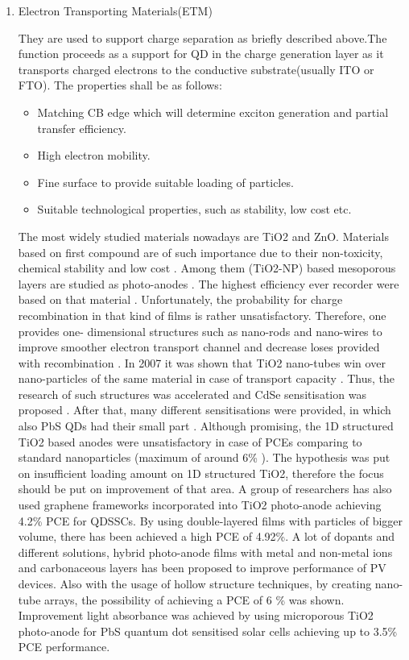 \begin{enumerate}

\item Electron Transporting Materials(ETM)

They are used to support charge separation as briefly described above.The function proceeds as a support for QD in the charge generation layer as it transports charged electrons to the conductive substrate(usually ITO or FTO). \cite{X.Gao2017} \cite{Tian2015} The properties shall be as follows:
\begin{itemize}
\item
  Matching CB edge which will determine exciton generation and
  partial transfer efficiency.
\item
  High electron mobility.
\item
  Fine surface to provide suitable loading of particles.
\item
  Suitable technological properties, such as stability, low cost etc.
\end{itemize}

The most widely studied materials nowadays are TiO2 and ZnO. Materials based on first compound are of such importance due to their non-toxicity, chemical stability and low cost \cite{I.Mora-Sero2014a} \cite{Tian2015} . Among them (TiO2-NP) based mesoporous layers are studied as photo-anodes \cite{I.Mora-Sero2014a} . The highest efficiency ever recorder were based on that material \cite{Du2016} \cite{J.Du2017} . Unfortunately, the probability for charge recombination in that kind of films is rather unsatisfactory.  Therefore, one provides one- dimensional structures such as nano-rods and nano-wires to improve smoother electron transport channel and decrease loses provided with recombination \cite{Y.Liu2014} \cite{M.A.Manthrammel2015} . In 2007 it was shown that TiO2 nano-tubes win over nano-particles of the same material in case of transport capacity \cite{Kamat2009} \cite{Tvrdy2008} .  Thus, the research of such structures was accelerated and CdSe sensitisation was proposed \cite{A.Yamada2010} . After that, many different sensitisations were provided, in which also PbS QDs had their small part \cite{C.Shi2017} . Although promising, the 1D structured TiO2 based anodes were unsatisfactory in case of PCEs comparing to standard nanoparticles (maximum of around 6\%  ). The hypothesis was put on insufficient loading amount on 1D structured TiO2, therefore the focus should be put on improvement of that area. A group of researchers has also used graphene frameworks incorporated into TiO2 photo-anode achieving 4.2\% PCE for QDSSCs. \cite{XinMeng2014} By using double-layered films with particles of bigger volume, there has been achieved a high PCE of 4.92\%. A lot of dopants and different solutions, hybrid photo-anode films with metal and non-metal ions and carbonaceous layers has been proposed to improve performance of PV devices. Also with the usage of hollow structure techniques, by creating nano-tube arrays, the possibility of achieving a PCE of 6 \% was shown. \cite{MikhailArtemyev2019} Improvement light absorbance was achieved by using microporous TiO2 photo-anode for PbS quantum dot sensitised solar cells achieving up to 3.5\% PCE performance.


\end{enumerate}
